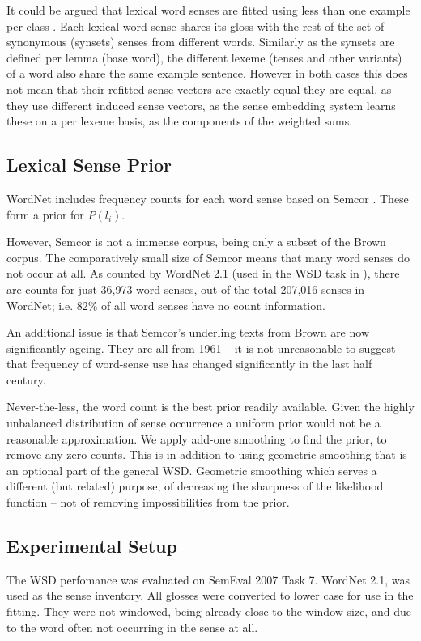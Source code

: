 \documentclass{sig-alternate}
\begin{document}
It could be argued that lexical word senses are fitted using less than one example per class . Each lexical word sense shares its gloss with the rest of the set of synonymous (synsets) senses from different words. Similarly as the synsets are defined per lemma (base word), the different lexeme (tenses and other variants) of a word also share the same example sentence. However in both cases this does not mean that their refitted sense vectors are exactly equal they are equal, as they use different induced sense vectors, as the sense embedding system learns these on a per lexeme basis, as the components of the weighted sums. 

\subsection{Lexical Sense Prior}
WordNet includes frequency counts for each word sense based on Semcor \textcite{tengi1998design}. These form a prior for $P(l_i)$.

However, Semcor is not a immense corpus, being only a subset of the Brown corpus. The comparatively small size of Semcor means that many word senses do not occur at all. As counted by WordNet 2.1 (used in the WSD task in ), there are counts for just  36,973 word senses, out of the total 207,016 senses in WordNet; i.e. 82\% of all word senses have no count information.

An additional issue is that Semcor's underling texts from Brown are now significantly ageing. They are all from 1961 \cite{francis1979brown} -- it is not unreasonable to suggest that frequency of word-sense use has changed significantly in the last half century.

Never-the-less, the word count is the best prior readily available. Given the highly unbalanced distribution of sense occurrence a uniform prior would not be a reasonable approximation.
We apply add-one smoothing to find the prior, to remove any zero counts.
This is in addition to using geometric smoothing that is an optional part of the general WSD. Geometric smoothing which serves a different (but related) purpose, of decreasing the sharpness of the likelihood function -- not of removing impossibilities from the prior.

\subsection {Experimental Setup}
The WSD perfomance was evaluated on SemEval 2007 Task 7. 
WordNet 2.1, was used as the sense inventory.
All glosses were converted to lower case for use in the fitting.
They were not windowed, being already close to the window size, and due to the word often not occurring in the sense at all.
\end{document}
